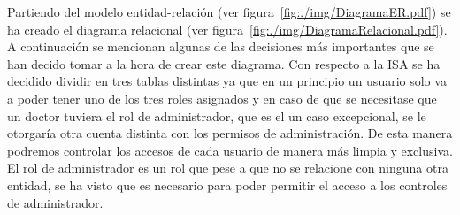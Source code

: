 Partiendo del modelo entidad-relación (ver figura~\ref{fig:./img/DiagramaER.pdf}) se ha creado el diagrama relacional (ver figura~\ref{fig:./img/DiagramaRelacional.pdf}).
A continuación se mencionan algunas de las decisiones más importantes que se han decido tomar a la hora de crear este diagrama.
Con respecto a la ISA se ha decidido dividir en tres tablas distintas ya que en un principio un usuario solo va a poder tener uno de los tres roles asignados y en caso de que se necesitase que un doctor tuviera el rol de administrador, que es el un caso excepcional, se le otorgaría otra cuenta distinta con los permisos de administración. De esta manera podremos controlar los accesos de cada usuario de manera más limpia y exclusiva.
El rol de administrador es un rol que pese a que no se relacione con ninguna otra entidad, se ha visto que es necesario para poder permitir el acceso a los controles de administrador.

